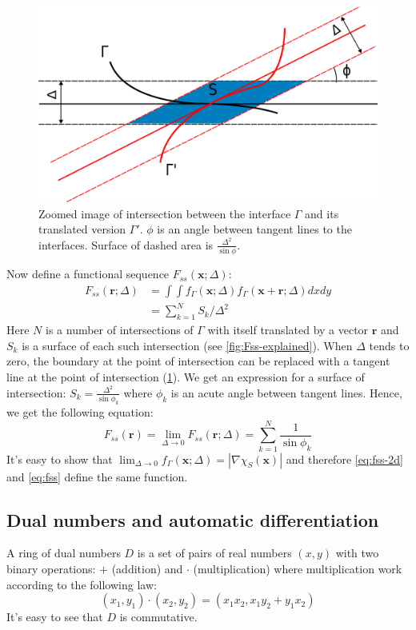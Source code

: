 \documentclass[reprint,amsmath,amssymb,aps,pre,showkeys,showpacs]{revtex4-1}
\begin{document}
\begin{figure}
  \centering
  \includegraphics[width=\linewidth]{images/fss-zoomed.png}
  \caption[]{Zoomed image of intersection between the interface $\Gamma$ and its
    translated version $\Gamma'$. $\phi$ is an angle between tangent lines to
    the interfaces. Surface of dashed area is $\frac{\Delta^2}{\sin \phi}$.}
  \label{fig:fss-zoomed}
\end{figure}
Now define a functional sequence $F_{ss}(\bm{x}; \Delta)$:
\begin{align*}
  F_{ss}(\bm{r}; \Delta) &= \int\int f_\Gamma(\bm{x}; \Delta) f_\Gamma(\bm{x}
  + \bm{r}; \Delta) dx dy \\
  &= \sum_{k=1}^N S_k/\Delta^2
\end{align*}
Here $N$ is a number of intersections of $\Gamma$ with itself translated by a
vector $\bm{r}$ and $S_k$ is a surface of each such intersection (see
\cref{fig:Fss-explained}).
When $\Delta$ tends to zero, the boundary at the point of intersection can
be replaced with a tangent line at the point of intersection
(\cref{fig:fss-zoomed}). We get an expression for a surface of
intersection: $S_k = \frac{\Delta^2}{\sin \phi_k}$ where $\phi_k$ is an
acute angle between tangent lines. Hence, we get the following equation:
\begin{equation}
  F_{ss}(\bm{r}) = \lim_{\Delta \to 0} F_{ss}(\bm{r}; \Delta) =
  \sum_{k=1}^N \frac{1}{\sin \phi_k} \label{eq:fss-2d}
\end{equation}
It's easy to show that
$\lim_{\Delta \to 0} f_\Gamma(\bm{x}; \Delta) = |\nabla \chi_S(\bm{x})|$
and therefore \cref{eq:fss-2d} and \cref{eq:fss} define the same function.

\subsection{Dual numbers and automatic differentiation}
\label{sec:dual}
A ring of dual numbers $D$ is a set of pairs of real numbers $(x, y)$ with two
binary operations: $+$ (addition) and $\cdot$ (multiplication) where
multiplication work according to the following law:
\begin{equation*}
  (x_1, y_1)\cdot(x_2, y_2) = (x_1x_2, x_1y_2 + y_1x_2)
\end{equation*}
It's easy to see that $D$ is commutative.
\end{document}
